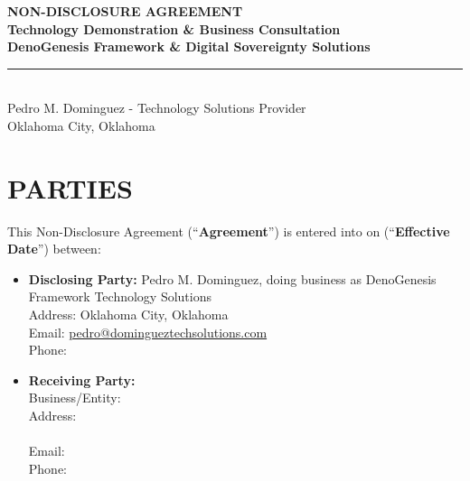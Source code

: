 \documentclass[11pt,letterpaper]{article}
\begin{document}
\begin{center}
    {\Huge\textbf{\textcolor{primaryblue}{NON-DISCLOSURE AGREEMENT}}}\\[0.3cm]
    {\Large\textcolor{accentgold}{\textbf{Technology Demonstration \& Business Consultation}}}\\[0.5cm]
    {\large\textbf{DenoGenesis Framework \& Digital Sovereignty Solutions}}\\[0.2cm]
    \rule{0.8\textwidth}{2pt}\\[0.5cm]
    {\large Pedro M. Dominguez - Technology Solutions Provider}\\
    {\normalsize Oklahoma City, Oklahoma}\\[0.3cm]
\end{center}

\section{PARTIES}

This Non-Disclosure Agreement (``\textbf{Agreement}'') is entered into on \underline{\hspace{3cm}} (``\textbf{Effective Date}'') between:

\begin{itemize}[leftmargin=1cm]
    \item[] \textbf{Disclosing Party:} Pedro M. Dominguez, doing business as DenoGenesis Framework Technology Solutions\\
    Address: Oklahoma City, Oklahoma\\
    Email: \href{mailto:pedro@domingueztechsolutions.com}{pedro@domingueztechsolutions.com}\\
    Phone: \underline{\hspace{4cm}}
    
    \item[] \textbf{Receiving Party:} \underline{\hspace{8cm}}\\
    Business/Entity: \underline{\hspace{8cm}}\\
    Address: \underline{\hspace{8cm}}\\
    \underline{\hspace{8cm}}\\
    Email: \underline{\hspace{8cm}}\\
    Phone: \underline{\hspace{4cm}}
\end{itemize}
\end{document}
